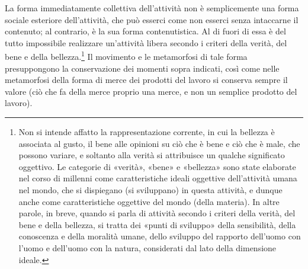 \documentclass[../main]{subfiles}
\begin{document}
La forma immediatamente collettiva dell'attività non è semplicemente una forma sociale esteriore dell'attività, che può esserci come non esserci senza intaccarne il contenuto; al contrario, è la sua forma contenutistica. Al di fuori di essa è del tutto impossibile realizzare un'attività libera secondo i criteri della verità, del bene e della bellezza.\footnote{Non si intende affatto la rappresentazione corrente, in cui la bellezza è associata al gusto, il bene alle opinioni su ciò che è bene e ciò che è male, che possono variare, e soltanto alla verità si attribuisce un qualche significato oggettivo. Le categorie di «verità», «bene» e «bellezza» sono state elaborate nel corso di millenni come caratteristiche ideali oggettive dell'attività umana nel mondo, che si dispiegano (si sviluppano) in questa attività, e dunque anche come caratteristiche oggettive del mondo (della materia). In altre parole, in breve, quando si parla di attività secondo i criteri della verità, del bene e della bellezza, si tratta dei «punti di sviluppo» della sensibilità, della conoscenza e della moralità umane, dello sviluppo del rapporto dell'uomo con l'uomo e dell'uomo con la natura, considerati dal lato della dimensione ideale.} Il movimento e le metamorfosi di tale forma presuppongono la conservazione dei momenti sopra indicati, così come nelle metamorfosi della forma di merce dei prodotti del lavoro si conserva sempre il valore (ciò che fa della merce proprio una merce, e non un semplice prodotto del lavoro).
\end{document}
